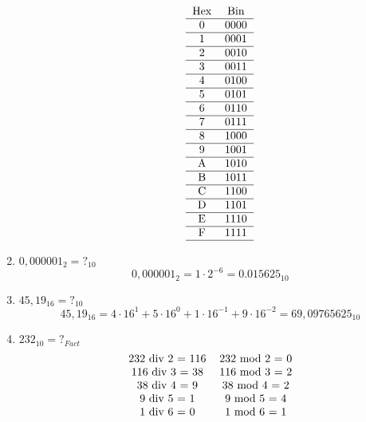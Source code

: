 \documentclass{article}
\begin{document}
\begin{enumerate}
$$          \;\;\;\;\;\;\;\\
          \begin{tabular}{cc}
            Hex & Bin  \\
            \hline
            0   & 0000 \\
            \hline
            1   & 0001 \\
            \hline
            2   & 0010 \\
            \hline
            3   & 0011 \\
            \hline
            4   & 0100 \\
            \hline
            5   & 0101 \\
            \hline
            6   & 0110 \\
            \hline
            7   & 0111 \\
            \hline
            8   & 1000 \\
            \hline
            9   & 1001 \\
            \hline
            A   & 1010 \\
            \hline
            B   & 1011 \\
            \hline
            C   & 1100 \\
            \hline
            D   & 1101 \\
            \hline
            E   & 1110 \\
            \hline
            F   & 1111 \\
            \hline
          \end{tabular}
        $$
  \item $ 0,000001_{2}     = ?_{10}$
        $$  0,000001_{2} = 1\cdot2^{-6} = 0.015625_{10} $$
  \item $ 45,19_{16}       = ?_{10}$
        $$  45,19_{16} =
          4\cdot16^{1} + 5\cdot16^{0} + 1\cdot16^{-1} + 9\cdot16^{-2}  =
          69,09765625_{10} $$
  \item $ 232_{10}         = ?_{Fact}$
        $$
          \begin{tabular}{cc}
            232 div 2 = 116 & 232 mod 2 = 0 \\
            116 div 3 = 38  & 116 mod 3 = 2 \\
            38 div 4 = 9    & 38 mod 4 = 2  \\
            9 div 5 = 1     & 9 mod 5 = 4   \\
            1 div 6 = 0     & 1 mod 6 = 1   \\
          \end{tabular}
$$
\end{enumerate}
\end{document}
